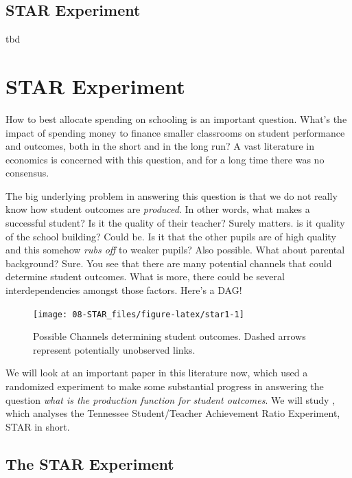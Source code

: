 \documentclass[]{book}
\begin{document}
\section{STAR Experiment}\label{star-experiment}

tbd

\chapter{STAR Experiment}\label{STAR}

How to best allocate spending on schooling is an important question.
What's the impact of spending money to finance smaller classrooms on
student performance and outcomes, both in the short and in the long run?
A vast literature in economics is concerned with this question, and for
a long time there was no consensus.

The big underlying problem in answering this question is that we do not
really know how student outcomes are \emph{produced}. In other words,
what makes a successful student? Is it the quality of their teacher?
Surely matters. is it quality of the school building? Could be. Is it
that the other pupils are of high quality and this somehow \emph{rubs
off} to weaker pupils? Also possible. What about parental background?
Sure. You see that there are many potential channels that could
determine student outcomes. What is more, there could be several
interdependencies amongst those factors. Here's a DAG!

\begin{figure}

{\centering \texttt{[image: 08-STAR\_files/figure-latex/star1-1]} 

}

\caption{Possible Channels determining student outcomes. Dashed arrows represent potentially unobserved links.}\label{fig:star1}
\end{figure}

We will look at an important paper in this literature now, which used a
randomized experiment to make some substantial progress in answering the
question \emph{what is the production function for student outcomes}. We
will study \citet{krueger1999}, which analyses the Tennessee
Student/Teacher Achievement Ratio Experiment, STAR in short.

\section{The STAR Experiment}\label{the-star-experiment}
\end{document}
